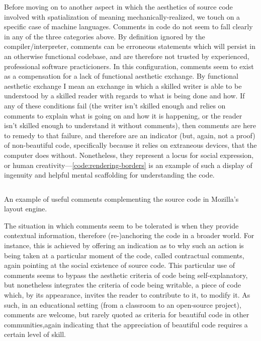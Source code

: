 Before moving on to another aspect in which the aesthetics of source code involved with spatialization of meaning mechanically-realized, we touch on a specific case of machine languages. Comments in code do not seem to fall clearly in any of the three categories above. By definition ignored by the compiler/interpreter, comments can be erroneous statements which will persist in an otherwise functional codebase, and are therefore not trusted by experienced, professional software practicioners. In this configuration, comments seem to exist as a compensation for a lack of functional aesthetic exchange. By functional aesthetic exchange I mean an exchange in which a skilled writer is able to be understood by a skilled reader with regards to what is being done and how. If any of these conditions fail (the writer isn't skilled enough and relies on comments to explain what is going on and how it is happening, or the reader isn't skilled enough to understand it without comments), then comments are here to remedy to that failure, and therefore are an indicator (but, again, not a proof) of non-beautiful code, specifically because it relies on extraneous devices, that the computer does without. Nonetheless, they represent a locus for social expression, or human creativity—\ref{code:rendering-borders} is an example of such a display of ingenuity and helpful mental scaffolding for understanding the code.

\begin{listing}
  \inputminted{c}{./corpus/nsCSSRenderingBorders.cpp}
  \caption{An example of useful comments complementing the source code in Mozilla's layout engine.}
  \label{code:rendering-borders}
\end{listing}

The situation in which comments seem to be tolerated is when they provide contextual information, therefore (re-)anchoring the code in a broader world. For instance, this is achieved by offering an indication as to why such an action is being taken at a particular moment of the code, called contractual comments, again pointing at the social existence of source code. This particular use of comments seems to bypass the aesthetic criteria of code being self-explanatory, but nonetheless integrates the criteria of code being writable, a piece of code which, by its appearance, invites the reader to contribute to it, to modify it. As such, in an educational setting (from a classroom to an open-source project), comments are welcome, but rarely quoted as criteria for beautiful code in other communities,again indicating that the appreciation of beautiful code requires a certain level of skill.

